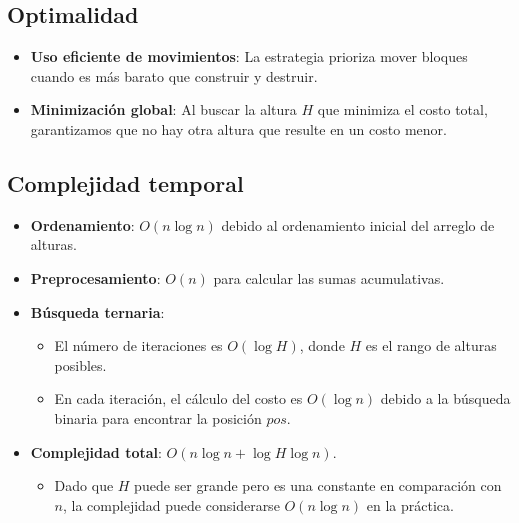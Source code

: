\documentclass[a4paper,12pt]{article}
\begin{document}
\subsection{Optimalidad}

\begin{itemize}
	\item \textbf{Uso eficiente de movimientos}: La estrategia prioriza mover bloques cuando es más barato que construir y destruir.
	\item \textbf{Minimización global}: Al buscar la altura $H$ que minimiza el costo total, garantizamos que no hay otra altura que resulte en un costo menor.
\end{itemize}

\subsection{Complejidad temporal}

\begin{itemize}
	\item \textbf{Ordenamiento}: $O(n \log n)$ debido al ordenamiento inicial del arreglo de alturas.
	\item \textbf{Preprocesamiento}: $O(n)$ para calcular las sumas acumulativas.
	\item \textbf{Búsqueda ternaria}:
	\begin{itemize}
		\item El número de iteraciones es $O(\log H)$, donde $H$ es el rango de alturas posibles.
		\item En cada iteración, el cálculo del costo es $O(\log n)$ debido a la búsqueda binaria para encontrar la posición $pos$.
	\end{itemize}
	\item \textbf{Complejidad total}: $O(n \log n + \log H \log n)$.
	\begin{itemize}
		\item Dado que $H$ puede ser grande pero es una constante en comparación con $n$, la complejidad puede considerarse $O(n \log n)$ en la práctica.
	\end{itemize}
\end{itemize}
\end{document}
